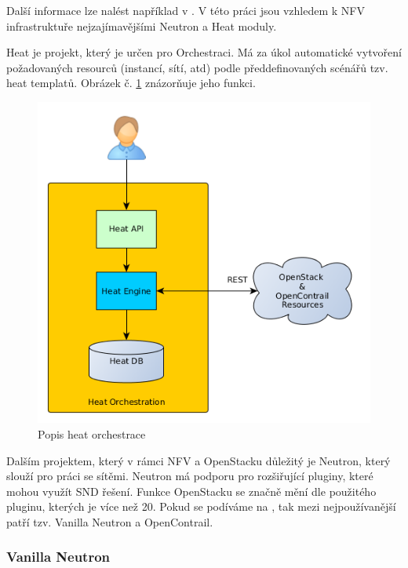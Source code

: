 Další informace lze nalést například v \cite{OpenStack}. V této práci jsou vzhledem k NFV infrastruktuře nejzajímavějšími Neutron a Heat moduly.

Heat je projekt, který je určen pro Orchestraci. Má za úkol automatické vytvoření požadovaných resourců (instancí, sítí, atd) podle předdefinovaných scénářů tzv. heat templatů. Obrázek č. \ref{fig:heat_engine} znázorňuje jeho funkci. \cite{HEAT}

\begin{figure}[h]
\begin{centering}
\includegraphics[scale=0.5]{images/heat_engine}
\par\end{centering}
\caption{Popis heat orchestrace\label{fig:heat_engine}}
\end{figure}

Dalším projektem, který v rámci NFV a OpenStacku důležitý je Neutron, který slouží pro práci se sítěmi. Neutron má podporu pro rozšiřující pluginy, které mohou využít SND řešení. Funkce OpenStacku se značně mění dle použitého pluginu, kterých je více než 20. Pokud se podíváme na \cite{neutron_survey} , tak mezi nejpoužívanější patří tzv. Vanilla Neutron a OpenContrail. 

\subsubsection{Vanilla Neutron}

